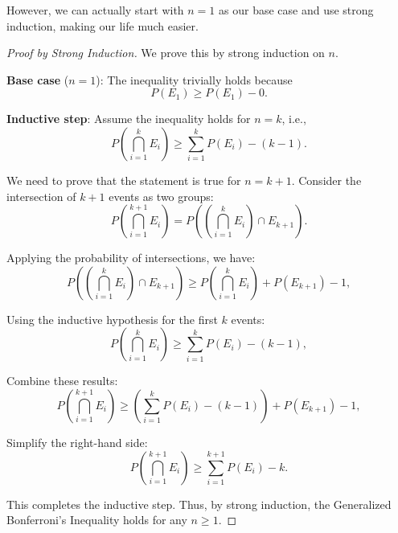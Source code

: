         However, we can actually start with $n=1$ as our base case and use strong induction, making our life much easier.
        \begin{proof}[Proof by Strong Induction]
            We prove this by strong induction on \(n\).
            
            \textbf{Base case} (\(n=1\)): The inequality trivially holds because
            \[
            P(E_1) \geq P(E_1) - 0.
            \]
            
            \textbf{Inductive step}: Assume the inequality holds for \(n = k\), i.e.,
            \[
            P\left(\bigcap_{i=1}^k E_i\right) \geq \sum_{i=1}^k P(E_i) - (k - 1).
            \]
            
            We need to prove that the statement is true for \(n = k+1\). Consider the intersection of \(k+1\) events as two groups:
            \[
            P\left(\bigcap_{i=1}^{k+1} E_i\right) = P\left(\left(\bigcap_{i=1}^k E_i\right) \cap E_{k+1}\right).
            \]
            
            Applying the probability of intersections, we have:
            \[
            P\left(\left(\bigcap_{i=1}^k E_i\right) \cap E_{k+1}\right) \geq P\left(\bigcap_{i=1}^k E_i\right) + P(E_{k+1}) - 1,
            \]
            
            Using the inductive hypothesis for the first \(k\) events:
            \[
            P\left(\bigcap_{i=1}^k E_i\right) \geq \sum_{i=1}^k P(E_i) - (k - 1),
            \]
            
            Combine these results:
            \[
            P\left(\bigcap_{i=1}^{k+1} E_i\right) \geq \left(\sum_{i=1}^k P(E_i) - (k - 1)\right) + P(E_{k+1}) - 1,
            \]
            
            Simplify the right-hand side:
            \[
            P\left(\bigcap_{i=1}^{k+1} E_i\right) \geq \sum_{i=1}^{k+1} P(E_i) - k.
            \]
            
            This completes the inductive step. Thus, by strong induction, the Generalized Bonferroni's Inequality holds for any \(n \geq 1\).
            \end{proof}
